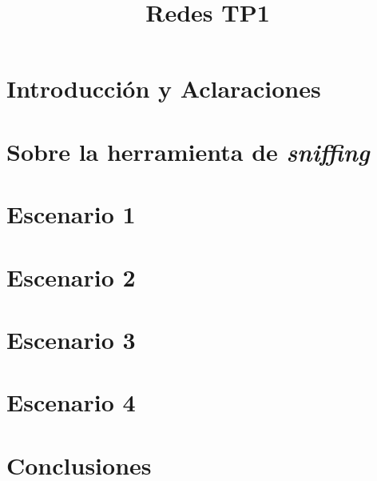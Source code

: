 \documentclass[%
	final,
	notitlepage,
	narroweqnarray,
	inline,
	twoside,
	]{ieee}
\title{Redes TP1}
\newcommand{\latexiie}{\LaTeX2{\Large$_\varepsilon$}}
\begin{document}




\begin{abstract}
	
\end{abstract}


\section*{Introducci\'on y Aclaraciones}\label{sec:introduccion}
	

\section*{Sobre la herramienta de \textit{sniffing}}
	

\section{Escenario 1}
	

\section{Escenario 2}
	

\section{Escenario 3}
	

\section{Escenario 4}
	

\section{Conclusiones}
	

\printbibliography
\end{document}
